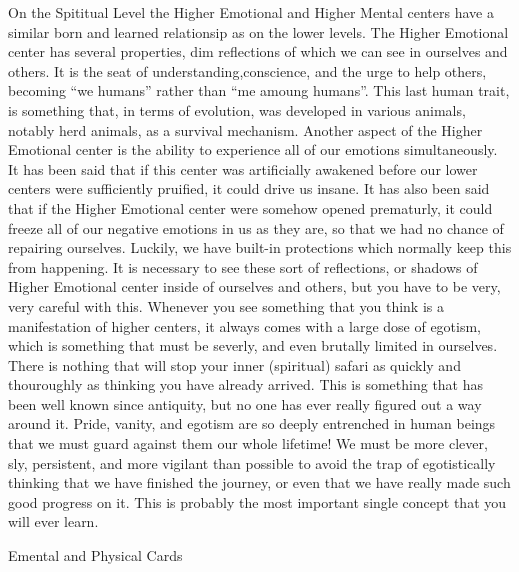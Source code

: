 \documentclass[12pt,letterpaper]{book}
\begin{document}
On the Spititual Level the Higher Emotional and Higher Mental centers have a similar born and learned relationsip as on the lower levels. The Higher Emotional center has several properties, dim reflections of which we can see in ourselves and others. It is the seat of understanding,conscience, and the urge to help others, becoming ``we humans'' rather than ``me amoung humans''. This last human trait, is something that, in terms of evolution, was developed in various animals, notably herd animals, as a survival mechanism. %
Another aspect of the Higher Emotional center is the ability to experience all of our emotions simultaneously. It has been said that if this center was artificially awakened before our lower centers were sufficiently pruified, it could drive us insane. It has also been said that if the Higher Emotional center were somehow opened prematurly, it could freeze all of our negative emotions in us as they are, so that we had no chance of repairing ourselves. Luckily, we have built-in protections which normally keep this from happening. It is necessary to see these sort of reflections, or shadows of Higher Emotional center inside of ourselves and others, but you have to be very, very careful with this. Whenever you see something that you think is a manifestation of higher centers, it always comes with a large dose of egotism, which is something that must be severly, and even brutally limited in ourselves. There is nothing that will stop your inner (spiritual) safari as quickly and thouroughly as thinking you have already arrived. This is something that has been well known since antiquity, but no one has ever really figured out a way around it. Pride, vanity, and egotism are so deeply entrenched in human beings that we must guard against them our whole lifetime! We must be more clever, sly, persistent, and more vigilant than possible to avoid the trap of egotistically thinking that we have finished the journey, or even that we have really made such good progress on it. This is probably the most important single concept that you will ever learn.

Emental and Physical Cards
\end{document}
